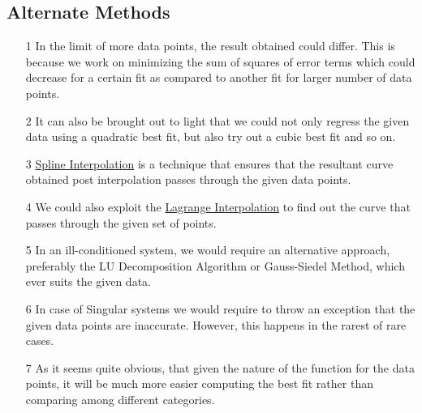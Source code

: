 \documentclass[titlepage, 11pt]{article}
\begin{document}

\subsection{Alternate Methods}
\begin{itemize}
    \item [1] In the limit of more data points, the result obtained could differ. This is because we work on minimizing the sum of squares of error terms which could decrease for a certain fit as compared to another fit for larger number of data points.
    \item [2] It can also be brought out to light that we could not only regress the given data using a quadratic best fit, but also try out a cubic best fit and so on.
    \item [3] \href{https://en.wikipedia.org/wiki/Spline_interpolation}{Spline Interpolation} is a technique that ensures that the resultant curve obtained post interpolation passes through the given data points.
    \item [4] We could also exploit the \href{https://en.wikipedia.org/wiki/Lagrange_polynomial}{Lagrange Interpolation} to find out the curve that passes through the given set of points.
    \item [5] In an ill-conditioned system, we would require an alternative approach, preferably the LU Decomposition Algorithm or Gauss-Siedel Method, which ever suits the given data. 
    \item [6] In case of Singular systems we would require to throw an exception that the given data points are inaccurate. However, this happens in the rarest of rare cases.
    \item [7] As it seems quite obvious, that given the nature of the function for the data points, it will be much more easier computing the best fit rather than comparing among different categories.
\end{itemize}

\newpage
\end{document}
